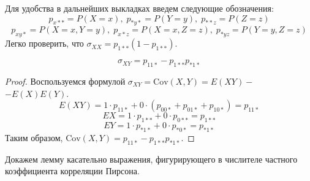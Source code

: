 Для удобства в дальнейших выкладках введем следующие обозначения: $$p_{x**}=P(X=x), \; p_{*y*}=P(Y=y), \; p_{**z}=P(Z=z)$$
$$p_{xy*}=P(X=x, Y=y), \; p_{x*z}=P(X=x, Z=z), \; p_{*yz}=P(Y=y, Z=z)$$
Легко проверить, что $\sigma_{XX}= p_{1**}(1-p_{1**})$.

\begin{lemma}
    $$\sigma_{XY}=p_{11*}-p_{1**}p_{*1*}$$
\end{lemma}

\begin{proof}
    Воспользуемся формулой $\sigma_{XY}=\text{Cov}(X,Y)=E(X Y)-$ $-E(X)E(Y)$.
    $$E(X Y) = 1 \cdot p_{11*} + 0 \cdot (p_{00*} + p_{01*} + p_{10*})=p_{11*}$$
    $$EX = 1 \cdot p_{1**} + 0 \cdot p_{0**}=p_{1**}$$
    $$ EY = 1 \cdot p_{*1*} + 0 \cdot p_{*0*} = p_{*1*}$$
    Таким образом, $\text{Cov}(X,Y)=p_{11*}-p_{1**}p_{*1*}$.
\end{proof}

Докажем лемму касательно выражения, фигурирующего в числителе частного коэффициента корреляции Пирсона.

